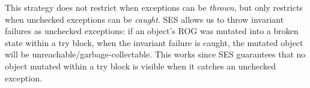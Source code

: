 This strategy does not restrict when exceptions can be \emph{thrown}, but only restricts when unchecked exceptions can be \emph{caught}.
SES allows us to throw invariant failures as unchecked exceptions: if an object's ROG was mutated into a broken state within a try block, when the invariant failure is caught, the mutated object will be unreachable/garbage-collectable. This works since SES guarantees that no object mutated within a try block is visible when it catches an unchecked exception.






% 


